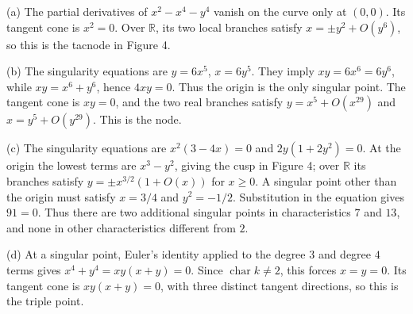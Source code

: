 (a) The partial derivatives of $x^2-x^4-y^4$ vanish on the curve only at $(0,0)$. Its tangent cone is $x^2=0$. Over $\mathbb{R}$, its two local branches satisfy $x=\pm y^2+O(y^6)$, so this is the tacnode in Figure 4.

(b) The singularity equations are $y=6x^5$, $x=6y^5$. They imply $xy=6x^6=6y^6$, while $xy=x^6+y^6$, hence $4xy=0$. Thus the origin is the only singular point. The tangent cone is $xy=0$, and the two real branches satisfy $y=x^5+O(x^{29})$ and $x=y^5+O(y^{29})$. This is the node.

(c) The singularity equations are $x^2(3-4x)=0$ and $2y(1+2y^2)=0$. At the origin the lowest terms are $x^3-y^2$, giving the cusp in Figure 4; over $\mathbb{R}$ its branches satisfy $y=\pm x^{3/2}(1+O(x))$ for $x\geq0$. A singular point other than the origin must satisfy $x=3/4$ and $y^2=-1/2$. Substitution in the equation gives $91=0$. Thus there are two additional singular points in characteristics $7$ and $13$, and none in other characteristics different from $2$.

(d) At a singular point, Euler's identity applied to the degree $3$ and degree $4$ terms gives $x^4+y^4=xy(x+y)=0$. Since $\operatorname{char}k\ne2$, this forces $x=y=0$. Its tangent cone is $xy(x+y)=0$, with three distinct tangent directions, so this is the triple point.
